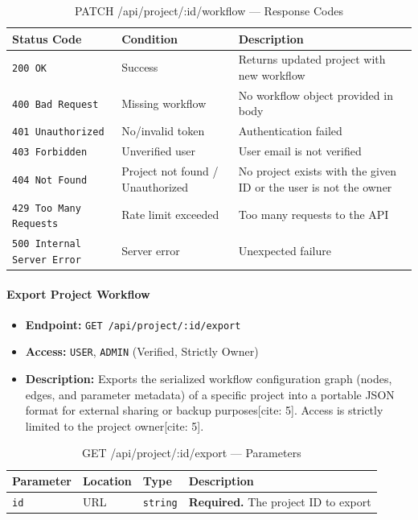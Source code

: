 \begin{table}[H]
\centering
\renewcommand{\arraystretch}{1.3}
\begin{tabularx}{\textwidth}{|l|l|X|}
\hline
\textbf{Status Code} & \textbf{Condition} & \textbf{Description} \\
\hline
\texttt{200 OK}           & Success              & Returns updated project with new workflow \\
\hline
\texttt{400 Bad Request}  & Missing workflow     & No workflow object provided in body \\
\hline
\texttt{401 Unauthorized} & No/invalid token     & Authentication failed \\
\hline
\texttt{403 Forbidden}    & Unverified user & User email is not verified \\
\hline
\texttt{404 Not Found}    & Project not found / Unauthorized  & No project exists with the given ID or the user is not the owner \\
\hline
\texttt{429 Too Many Requests} & Rate limit exceeded & Too many requests to the API \\
\hline
\texttt{500 Internal Server Error} & Server error & Unexpected failure \\
\hline
\end{tabularx}
\caption{PATCH /api/project/:id/workflow — Response Codes}
\label{tab:update-workflow-responses}
\end{table}
\FloatBarrier
\paragraph{Export Project Workflow}
\label{subsubsec:export-workflow}

\begin{itemize}
  \item \textbf{Endpoint:} \texttt{GET /api/project/:id/export}
  \item \textbf{Access:} \texttt{USER}, \texttt{ADMIN} (Verified, Strictly Owner)
  \item \textbf{Description:} Exports the serialized workflow configuration graph (nodes, edges, and parameter metadata) of a specific project into a portable JSON format for external sharing or backup purposes[cite: 5]. Access is strictly limited to the project owner[cite: 5].
\end{itemize}

\begin{table}[H]
\centering
\renewcommand{\arraystretch}{1.3}
\begin{tabularx}{\textwidth}{|l|l|l|X|}
\hline
\textbf{Parameter} & \textbf{Location} & \textbf{Type} & \textbf{Description} \\
\hline
\texttt{id}        & URL               & \texttt{string} & \textbf{Required.} The project ID to export \\
\hline
\end{tabularx}
\caption{GET /api/project/:id/export — Parameters}
\label{tab:export-workflow-params}
\end{table}

